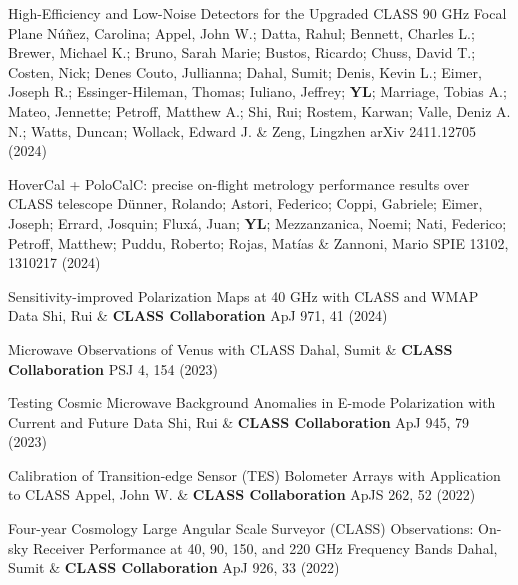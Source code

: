 \begin{etaremune}[topsep=0pt,itemsep=0pt,partopsep=0pt,parsep=0pt]
    \renewcommand\labelenumi{\footnotesize\bfseries\theenumi.}
    
            {High-Efficiency and Low-Noise Detectors for the Upgraded CLASS 90 GHz Focal Plane}
            {Núñez, Carolina; Appel, John W.; Datta, Rahul; Bennett, Charles L.; Brewer, Michael K.; Bruno, Sarah Marie; Bustos, Ricardo; Chuss, David T.; Costen, Nick; Denes Couto, Jullianna; Dahal, Sumit; Denis, Kevin L.; Eimer, Joseph R.; Essinger-Hileman, Thomas; Iuliano, Jeffrey; \textbf{YL}; Marriage, Tobias A.; Mateo, Jennette; Petroff, Matthew A.; Shi, Rui; Rostem, Karwan; Valle, Deniz A. N.; Watts, Duncan; Wollack, Edward J. \& Zeng, Lingzhen}
            {arXiv 2411.12705 (2024)}
    
            {HoverCal + PoloCalC: precise on-flight metrology performance results over CLASS telescope}
            {Dünner, Rolando; Astori, Federico; Coppi, Gabriele; Eimer, Joseph; Errard, Josquin; Fluxá, Juan; \textbf{YL}; Mezzanzanica, Noemi; Nati, Federico; Petroff, Matthew; Puddu, Roberto; Rojas, Matías \& Zannoni, Mario}
            {SPIE 13102, 1310217 (2024)}
    
            {Sensitivity-improved Polarization Maps at 40 GHz with CLASS and WMAP Data}
            {Shi, Rui \& \textbf{CLASS Collaboration}}
            {ApJ 971, 41 (2024)}
    
            {Microwave Observations of Venus with CLASS}
            {Dahal, Sumit \& \textbf{CLASS Collaboration}}
            {PSJ 4, 154 (2023)}
    
            {Testing Cosmic Microwave Background Anomalies in E-mode Polarization with Current and Future Data}
            {Shi, Rui \& \textbf{CLASS Collaboration}}
            {ApJ 945, 79 (2023)}
    
            {Calibration of Transition-edge Sensor (TES) Bolometer Arrays with Application to CLASS}
            {Appel, John W. \& \textbf{CLASS Collaboration}}
            {ApJS 262, 52 (2022)}
    
            {Four-year Cosmology Large Angular Scale Surveyor (CLASS) Observations: On-sky Receiver Performance at 40, 90, 150, and 220 GHz Frequency Bands}
            {Dahal, Sumit \& \textbf{CLASS Collaboration}}
            {ApJ 926, 33 (2022)}
    

\end{etaremune}
